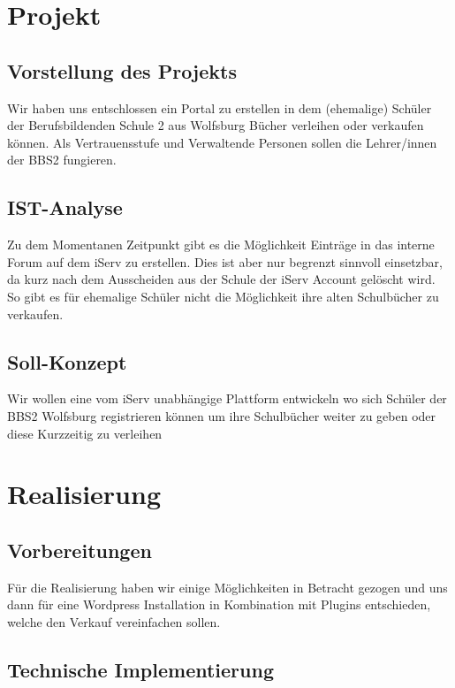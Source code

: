 \documentclass[a4paper, DIV20, 11pt, headsepline, parskip]{article}
\title{\usubject}
\author{\uauthor}
\newcommand{\udate}{05.06.2016}
\begin{document}
\date{\udate}
\maketitle
\thispagestyle{empty}
\newpage
\setcounter{page}{1}
\tableofcontents
\pagebreak
\section{Projekt}

\subsection{Vorstellung des Projekts}
Wir haben uns entschlossen ein Portal zu erstellen in dem (ehemalige) Schüler der Berufsbildenden Schule 2 aus Wolfsburg Bücher verleihen oder verkaufen können.
Als Vertrauensstufe und Verwaltende Personen sollen die Lehrer/innen der BBS2 fungieren. 
\subsection{IST-Analyse}
Zu dem Momentanen Zeitpunkt gibt es die Möglichkeit Einträge in das interne Forum auf dem iServ zu erstellen.
Dies ist aber nur begrenzt sinnvoll einsetzbar, da kurz nach dem Ausscheiden aus der Schule der iServ Account gelöscht wird.
So gibt es für ehemalige Schüler nicht die Möglichkeit ihre alten Schulbücher zu verkaufen.
\subsection{Soll-Konzept}
Wir wollen eine vom iServ unabhängige Plattform entwickeln wo sich Schüler der BBS2 Wolfsburg registrieren können um ihre Schulbücher weiter zu geben oder diese Kurzzeitig zu verleihen
\section{Realisierung}
\subsection{Vorbereitungen}
Für die Realisierung haben wir einige Möglichkeiten in Betracht gezogen und uns dann für eine Wordpress Installation in Kombination mit Plugins entschieden, welche den Verkauf vereinfachen sollen.
\subsection{Technische Implementierung}
\end{document}
